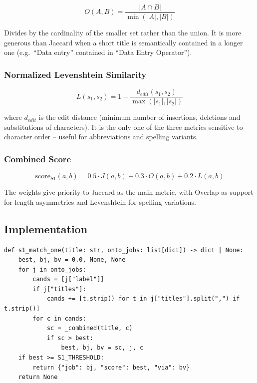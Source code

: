 \documentclass[12pt, a4paper]{report}
\begin{document}
\begin{equation}
O(A, B) = \frac{|A \cap B|}{\min(|A|, |B|)}
\end{equation}

Divides by the cardinality of the smaller set rather than the
union. It is more generous than Jaccard when a short title is
semantically contained in a longer one (e.g.\ ``Data entry''
contained in ``Data Entry Operator'').
\newpage
\subsubsection{Normalized Levenshtein Similarity}

\begin{equation}
L(s_1, s_2) = 1 - \frac{d_{edit}(s_1, s_2)}{\max(|s_1|, |s_2|)}
\end{equation}

where $d_{edit}$ is the edit distance (minimum number of insertions,
deletions and substitutions of characters). It is the only one of the
three metrics sensitive to character order -- useful for abbreviations
and spelling variants.

\subsubsection{Combined Score}

\begin{equation}
\text{score}_{S1}(a, b) = 0.5 \cdot J(a, b) + 0.3 \cdot O(a, b) + 0.2 \cdot L(a, b)
\end{equation}

The weights give priority to Jaccard as the main metric, with
Overlap as support for length asymmetries and Levenshtein for
spelling variations.

\subsection{Implementation}

\begin{lstlisting}[caption={S1 matching function}]
def s1_match_one(title: str, onto_jobs: list[dict]) -> dict | None:
    best, bj, bv = 0.0, None, None
    for j in onto_jobs:
        cands = [j["label"]]
        if j["titles"]:
            cands += [t.strip() for t in j["titles"].split(",") if t.strip()]
        for c in cands:
            sc = _combined(title, c)
            if sc > best:
                best, bj, bv = sc, j, c
    if best >= S1_THRESHOLD:
        return {"job": bj, "score": best, "via": bv}
    return None
\end{lstlisting}
\end{document}
